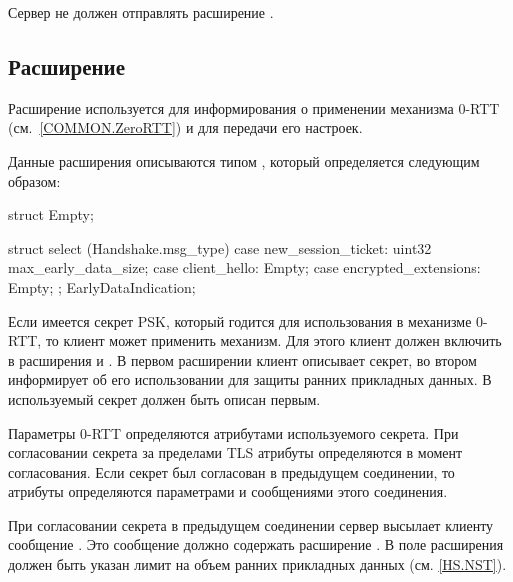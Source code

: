 
Сервер не должен отправлять расширение .

\subsection{Расширение }\label{HS.Ext.ed} 

Расширение  используется для информирования о применении 
механизма 0-RTT (см.~\ref{COMMON.ZeroRTT}) и для передачи его настроек.

Данные расширения  описываются типом 
, который определяется следующим образом: 

\begin{codeblock}
struct {} Empty;

struct {
  select (Handshake.msg_type) {
    case new_session_ticket:
      uint32 max_early_data_size;
    case client_hello: Empty;
    case encrypted_extensions: Empty;
  };
} EarlyDataIndication;
\end{codeblock}

Если имеется секрет PSK, который годится для использования 
в механизме 0-RTT, то клиент может применить механизм.
%
Для этого клиент должен включить в  расширения 
 и . В первом расширении 
клиент описывает секрет, во втором информирует об его использовании для 
защиты ранних прикладных данных. 
%
В  используемый секрет должен быть описан 
первым.

Параметры 0-RTT определяются атрибутами используемого секрета. 
%
При согласовании секрета за пределами TLS атрибуты определяются в момент 
согласования.
%
Если секрет был согласован в предыдущем соединении, то атрибуты определяются 
параметрами и сообщениями этого соединения.

При согласовании секрета в предыдущем соединении сервер высылает клиенту 
сообщение . Это сообщение должно  
содержать расширение . В поле 
 расширения должен быть  
указан лимит на объем ранних прикладных данных (см. \ref{HS.NST}).

